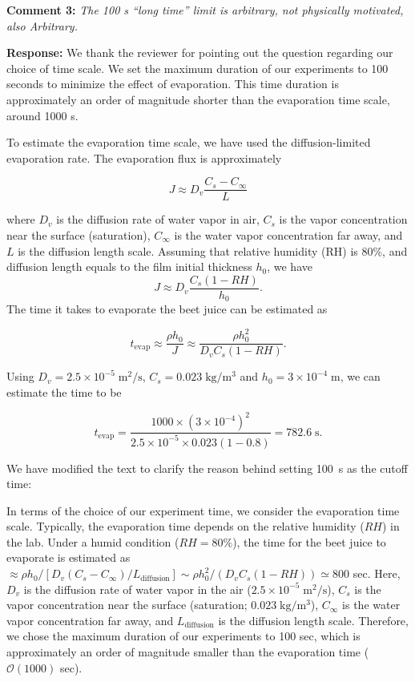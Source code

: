 \documentclass[11pt]{article}
\newif\ifhighlight
\newcommand{\hl}[1]{\ifhighlight\textcolor{blue}{#1}\else#1\fi}
\begin{document}
\bigskip
\begin{siderules}
\textbf{Comment 3:} \textit{The 100 s “long time” limit is arbitrary, not physically motivated, also Arbitrary.}
\end{siderules}

\textbf{Response:} We thank the reviewer for pointing out the question regarding our choice of time scale. We set the maximum duration of our experiments to 100 seconds to minimize the effect of evaporation. This time duration is approximately an order of magnitude shorter than the evaporation time scale, around 1000 s. 

To estimate the evaporation time scale, we have used the diffusion-limited evaporation rate. The evaporation flux is approximately

\begin{equation}
    J \approx D_v \frac{C_s - C_\infty}{L} 
\end{equation}

where $D_v$ is the diffusion rate of water vapor in air, $C_s$ is the vapor concentration near the surface (saturation), $C_\infty$ is the water vapor concentration far away, and $L$ is the diffusion length scale. Assuming that relative humidity (RH) is 80\%, and diffusion length equals to the film initial thickness $h_0$, we have
\begin{equation}
J \approx D_v \frac{C_s(1-RH)}{h_0}.
\end{equation}
The time it takes to evaporate the beet juice can be estimated as

\begin{equation}
    t_\mathrm{evap} \approx \frac{\rho h_0}{J} \approx \frac{\rho h_0^2}{D_vC_s(1-RH)}.
\end{equation}


Using $D_v=2.5\times 10^{-5}\;\mathrm{m^2/s}$, $C_s=0.023\;\mathrm{kg/m^3}$ and $h_0=3\times 10^{-4}\;\mathrm{m}$, we can estimate the time to be

\begin{equation}
    t_\mathrm{evap} = \frac{1000 \times (3\times 10^{-4})^2}{2.5\times 10^{-5} \times 0.023 (1 - 0.8) } = 782.6\;\mathrm{s}.
\end{equation}


We have modified the text to clarify the reason behind setting 100~s as the cutoff time:

\hl{In terms of the choice of our experiment time, we consider the evaporation time scale. Typically, the evaporation time depends on the relative humidity ($RH$) in the lab. Under a humid condition ($RH = 80\%$), the time for the beet juice to evaporate is estimated as $\approx {\rho h_0}/[D_v {(C_s - C_\infty)}/{L_\mathrm{diffusion}}] \sim {\rho h_0^2}/{(D_vC_s(1-RH))} \simeq 800$ sec. Here, $D_v$ is the diffusion rate of water vapor in the air ($2.5\times 10^{-5}\;\mathrm{m^2/s}$), $C_s$ is the vapor concentration near the surface (saturation; $0.023\;\mathrm{kg/m^3}$), $C_\infty$ is the water vapor concentration far away, and $L_\mathrm{diffusion}$ is the diffusion length scale. Therefore, we chose the maximum duration of our experiments to 100 sec, which is approximately an order of magnitude smaller than the evaporation time ($\mathcal{O} (1000)$ sec).} 
\end{document}
